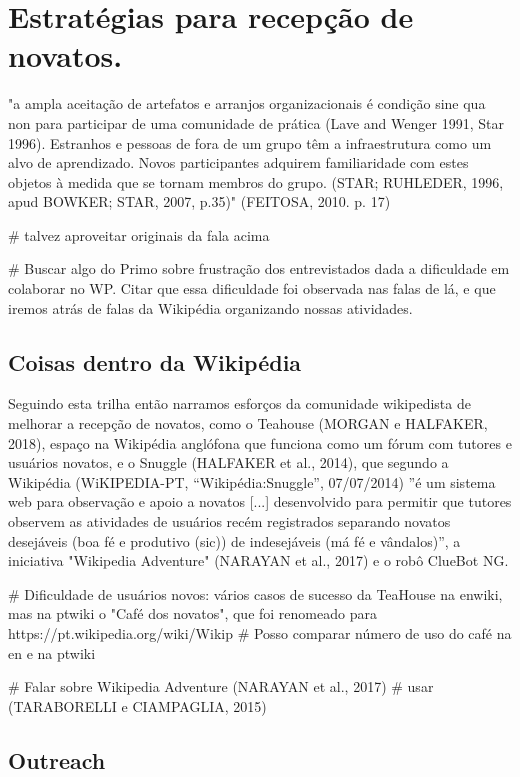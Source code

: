 \section{Estratégias para recepção de novatos.}

"a ampla aceitação de artefatos e arranjos organizacionais é condição sine qua non para participar de uma comunidade de prática (Lave and Wenger 1991, Star 1996). Estranhos e pessoas de fora de um grupo têm a infraestrutura como um alvo de aprendizado. Novos participantes adquirem familiaridade com estes objetos à medida que se tornam membros do grupo. (STAR; RUHLEDER, 1996, apud BOWKER; STAR, 2007, p.35)" (FEITOSA, 2010. p. 17)

# talvez aproveitar originais da fala acima

# Buscar algo do Primo sobre frustração dos entrevistados dada a dificuldade em colaborar no WP. Citar que essa dificuldade foi observada nas falas de lá, e que iremos atrás de falas da Wikipédia organizando nossas atividades.

\subsection{Coisas dentro da Wikipédia}

Seguindo esta trilha então narramos esforços da comunidade wikipedista de melhorar a recepção de novatos, como o Teahouse (MORGAN e HALFAKER, 2018), espaço na Wikipédia anglófona que funciona como um fórum com tutores e usuários novatos, e o Snuggle (HALFAKER et al., 2014), que segundo a Wikipédia (WiKIPEDIA-PT, “Wikipédia:Snuggle”, 07/07/2014) ”é um sistema web para observação e apoio a novatos [...] desenvolvido para permitir que tutores observem as atividades de usuários recém registrados separando novatos desejáveis (boa fé e produtivo (sic)) de indesejáveis (má fé e vândalos)”, a iniciativa "Wikipedia Adventure" (NARAYAN et al., 2017) e o robô ClueBot NG.


# Dificuldade de usuários novos: vários casos de sucesso da TeaHouse na enwiki, mas na ptwiki o "Café dos novatos", que foi renomeado para https://pt.wikipedia.org/wiki/Wikip%
# Posso comparar número de uso do café na en e na ptwiki


# Falar sobre Wikipedia Adventure (NARAYAN et al., 2017)
# usar (TARABORELLI e CIAMPAGLIA, 2015) 

\subsection{Outreach}

